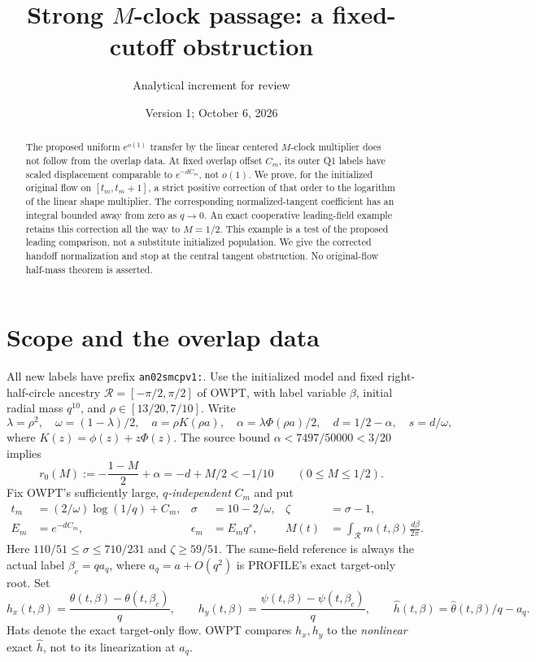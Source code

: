 \documentclass[11pt]{article}
\title{Strong $M$-clock passage: a fixed-cutoff obstruction}
\author{Analytical increment for review}
\date{Version 1; October 6, 2026}
\theoremstyle{remark}\newtheorem{remark}[theorem]{Remark}
\newcommand{\dd}{\,d}
\newcommand{\Rhalf}{\mathcal R}
\begin{document}
\maketitle
\begin{abstract}
The proposed uniform $e^{o(1)}$ transfer by the linear centered
$M$-clock multiplier does not follow from the overlap data.
At fixed overlap offset $C_m$, its outer Q1 labels have scaled
displacement comparable to $e^{-dC_m}$, not $o(1)$.
We prove, for the initialized original flow on $[t_m,t_m+1]$, a
strict positive correction of that order to the logarithm of the
linear shape multiplier. The corresponding normalized-tangent
coefficient has an integral bounded away from zero as $q\to0$.
An exact cooperative leading-field example retains this correction
all the way to $M=1/2$. This example is a test of the proposed
leading comparison, not a substitute initialized population.
We give the corrected handoff normalization and stop at the
central tangent obstruction. No original-flow half-mass theorem
is asserted.
\end{abstract}

\section{Scope and the overlap data}
All new labels have prefix \texttt{an02smcpv1:}.
Use the initialized model and fixed right-half-circle ancestry
$\Rhalf=[-\pi/2,\pi/2]$ of OWPT, with label variable $\beta$,
initial radial mass $q^{10}$, and $\rho\in[13/20,7/10]$.
Write
\[
 \lambda=\rho^2,\quad \omega=(1-\lambda)/2,\quad
 a=\rho K(\rho a),\quad \alpha=\lambda\Phi(\rho a)/2,
 \quad d=1/2-\alpha,\quad s=d/\omega,
\]
where $K(z)=\phi(z)+z\Phi(z)$.
The source bound $\alpha<7497/50000<3/20$ implies
\begin{equation}\label{an02smcpv1:rate}
 r_0(M):=-\frac{1-M}{2}+\alpha=-d+M/2<-1/10
 \qquad (0\le M\le1/2).
\end{equation}
Fix OWPT's sufficiently large, \emph{$q$-independent} $C_m$ and put
\begin{align}
 t_m&=(2/\omega)\log(1/q)+C_m,&
 \sigma&=10-2/\omega,& \zeta&=\sigma-1,\nonumber\\
 E_m&=e^{-dC_m},& \epsilon_m&=E_mq^s,&
 M(t)&=\int_{\Rhalf}m(t,\beta)\frac{\dd\beta}{2\pi}.
 \label{an02smcpv1:scales}
\end{align}
Here $110/51\le\sigma\le710/231$ and $\zeta\ge59/51$.
The same-field reference is always the actual label
$\beta_c=qa_q$, where $a_q=a+O(q^2)$ is PROFILE's exact
target-only root. Set
\[
 h_x(t,\beta)=\frac{\theta(t,\beta)-\theta(t,\beta_c)}q,
 \qquad
 h_y(t,\beta)=\frac{\psi(t,\beta)-\psi(t,\beta_c)}q,
 \qquad
 \widehat h(t,\beta)=\widehat\theta(t,\beta)/q-a_q.
\]
Hats denote the exact target-only flow.
OWPT compares $h_x,h_y$ to the \emph{nonlinear} exact
$\widehat h$, not to its linearization at $a_q$.
\end{document}
